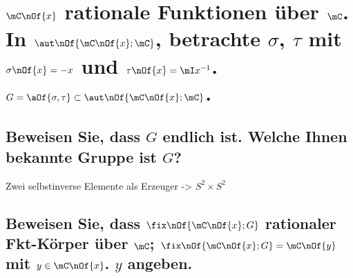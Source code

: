 \section{$\mC\nOf{x}$ rationale Funktionen über $\mC$. In $\aut\nOf{\mC\nOf{x};\mC}$, betrachte $\sigma$, $\tau$ mit $\sigma\nOf{x} = - x$ und $\tau\nOf{x} = \mI x^{-1}$. $G = \aOf{\sigma,\tau}\subset \aut\nOf{\mC\nOf{x};\mC}$.}

\subsection{Beweisen Sie, dass $G$ endlich ist. Welche Ihnen bekannte Gruppe ist $G$?}
Zwei selbstinverse Elemente als Erzeuger -> $S^2 \times S^2$

\subsection{Beweisen Sie, dass $\fix\nOf{\mC\nOf{x};G}$ rationaler Fkt-Körper über $\mC$; $\fix\nOf{\mC\nOf{x};G} = \mC\nOf{y}$ mit $y\in\mC\nOf{x}$. $y$ angeben.}
